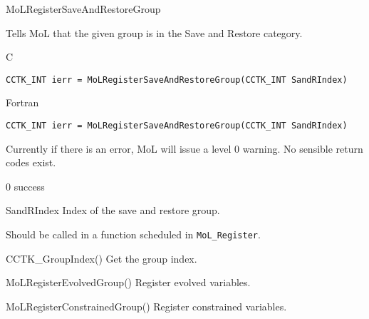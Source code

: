 \begin{FunctionDescription}{MoLRegisterSaveAndRestoreGroup}
  \label{CactusBase_MoL_MoLRegisterSaveAndRestoreGroup}
  
  Tells MoL that the given group is in the Save and Restore category.

  \begin{SynopsisSection}
    \begin{Synopsis}{C}
\begin{verbatim}
CCTK_INT ierr = MoLRegisterSaveAndRestoreGroup(CCTK_INT SandRIndex)
\end{verbatim}
    \end{Synopsis}
    \begin{Synopsis}{Fortran}
\begin{verbatim}
CCTK_INT ierr = MoLRegisterSaveAndRestoreGroup(CCTK_INT SandRIndex)
\end{verbatim}
    \end{Synopsis}
  \end{SynopsisSection}

  \begin{ResultSection}
    \begin{ResultNote}
      Currently if there is an error, MoL will issue a level 0
      warning. No sensible return codes exist.
    \end{ResultNote}
    \begin{Result}{\rm 0}
      success
    \end{Result}
  \end{ResultSection}

  \begin{ParameterSection}
    \begin{Parameter}{SandRIndex}
      Index of the save and restore group.
    \end{Parameter}
  \end{ParameterSection}

  \begin{Discussion}
    Should be called in a function scheduled in {\tt MoL\_Register}.
  \end{Discussion}

  \begin{SeeAlsoSection}
    \begin{SeeAlso}{CCTK\_GroupIndex()}
      Get the group index.
    \end{SeeAlso}
    \begin{SeeAlso}{MoLRegisterEvolvedGroup()}
      Register evolved variables.
    \end{SeeAlso}
    \begin{SeeAlso}{MoLRegisterConstrainedGroup()}
      Register constrained variables.
    \end{SeeAlso}
  \end{SeeAlsoSection}


\end{FunctionDescription}
